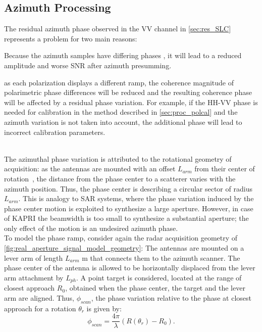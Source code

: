 \subsection{Azimuth Processing}\label{sec:azimuth_processing}
The residual  azimuth phase observed in the VV channel in \autoref{sec:res_SLC} represents a problem for two main reasons: \begin{enumerate*}
	\item Because the azimuth samples have differing phases
	, it will lead to a reduced amplitude and worse SNR after azimuth presumming. 
  \item as each polarization displays a different ramp, the coherence magnitude of polarimetric phase differences will be reduced and the resulting coherence phase will be affected by a residual phase variation. For example, if the HH-VV phase is needed for calibration in the method described in \autoref{sec:proc_polcal} and the azimuth variation is not taken into account, the additional phase will lead to incorrect calibration parameters.\label{item:phase_variation}\end{enumerate*}\\
The azimuthal phase variation is attributed to the rotational geometry of acquisition: as the antennas are mounted with an  offset $L_{arm}$ from their center of rotation~\cite{Lee2014}, the distance from the phase center to a scatterer varies with the azimuth position. Thus, the phase center is describing a circular sector of radius $L_{arm}$. This is analogy to SAR systems, where the phase variation induced by the phase center motion is exploited to synthesize a large aperture. However,  in case of KAPRI the beamwidth is too small to synthesize a substantial aperture; the only effect of the motion is an undesired azimuth phase.\\
To model the phase ramp, consider again the radar acquisition geometry of \autoref{fig:real_aperture_signal_model_geometry}:
The antennas are mounted on a lever arm of length $L_{arm}$ m that connects them to the azimuth scanner. The phase center of the antenna is allowed to be horizontally displaced from the lever arm attachment by $L_{ph}$.
A point target is considered, located at the  range of closest approach $R_{0}$, obtained when the phase center, the target and the lever arm are aligned. Thus, $\phi_{scan}$, the phase variation relative to the phase at closest approach for a rotation  $\theta_r$  is given by:
\begin{equation}\label{eq:range_phase}
	\phi_{scan} = \frac{4 \pi}{\lambda}\left(R\left(\theta_r\right) - R_0\right) .
\end{equation}
